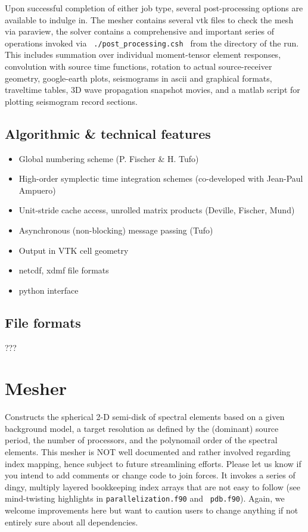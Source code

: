 \documentclass[11pt,letter,fleqn,english,notitlepage]{article}
\begin{document}
\noindent Upon successful completion of either job type, several
post-processing options are available to indulge in. The mesher contains
several vtk files to check the mesh via paraview, the solver contains a
comprehensive and important series of operations invoked via {\tt
./post\_processing.csh } from the directory of the run. This includes summation
over individual moment-tensor element responses, convolution with source time
functions, rotation to actual source-receiver geometry, google-earth plots,
seismograms in ascii and graphical formats, traveltime tables, 3D wave
propagation snapshot movies, and a matlab script for plotting seismogram record
sections.

\subsection{Algorithmic \& technical features}
\begin{itemize}
    \item Global numbering scheme (P. Fischer \& H. Tufo)
    \item High-order symplectic time integration schemes (co-developed with Jean-Paul Ampuero)
    \item Unit-stride cache access, unrolled matrix products (Deville, Fischer, Mund)
    \item Asynchronous (non-blocking) message passing (Tufo)
    \item Output in VTK cell geometry
    \item netcdf, xdmf file formats
    \item python interface 
\end{itemize}

\subsection{File formats}
???



% 



\newpage
\section{Mesher}
Constructs the spherical 2-D semi-disk of spectral elements based on a given
background model, a target resolution as defined by the (dominant) source
period, the number of processors, and the polynomail order of the spectral
elements. 
This mesher is NOT well documented and rather involved regarding
index mapping, hence subject to future streamlining efforts. Please let us know
if you intend to add comments or change code to join forces. It invokes a
series of dingy, multiply layered bookkeeping index arrays that are not easy to
follow (see mind-twisting highlights in {\tt parallelization.f90} and {\tt
pdb.f90}). Again, we welcome improvements here but want to caution users to
change anything if not entirely sure about all dependencies.\\
\end{document}
